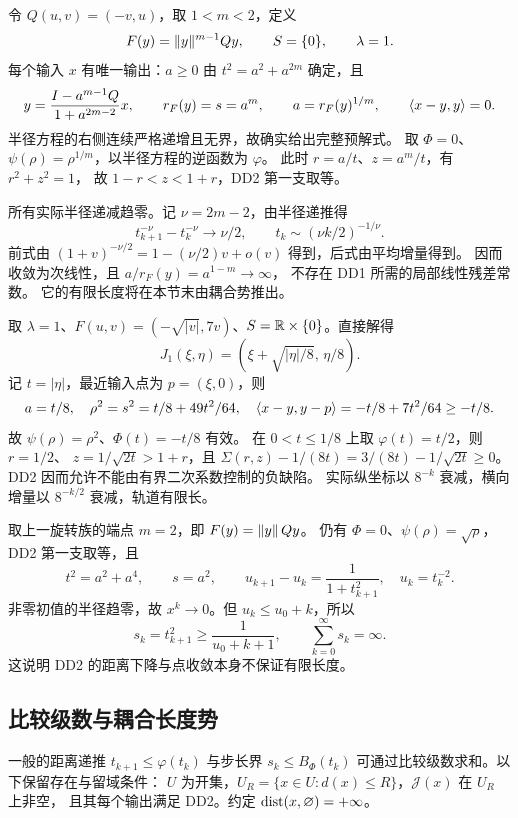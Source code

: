 \begin{example}[次线性收敛]\label{ex:dd2-rotation}
令 $Q(u,v)=(-v,u)$，取 $1<m<2$，定义
\[
 F(y)=\lVert y\rVert^{m-1}Qy,\qquad S=\{0\},\qquad \lambda=1.
\]
每个输入 $x$ 有唯一输出：$a\ge0$ 由 $t^2=a^2+a^{2m}$ 确定，且
\[
 y=\frac{I-a^{m-1}Q}{1+a^{2m-2}}x,\qquad
 r_F(y)=s=a^m,\qquad a=r_F(y)^{1/m},\qquad \langle x-y,y\rangle=0.
\]
半径方程的右侧连续严格递增且无界，故确实给出完整预解式。
取 $\Phi=0$、$\psi(\rho)=\rho^{1/m}$，以半径方程的逆函数为 $\varphi$。
此时 $r=a/t$、$z=a^m/t$，有 $r^2+z^2=1$，
故 $1-r<z<1+r$，DD2 第一支取等。

所有实际半径递减趋零。记 $\nu=2m-2$，由半径递推得
\[
 t_{k+1}^{-\nu}-t_k^{-\nu}\longrightarrow\nu/2,\qquad
 t_k\sim(\nu k/2)^{-1/\nu}.
\]
前式由 $(1+v)^{-\nu/2}=1-(\nu/2)v+o(v)$ 得到，后式由平均增量得到。
因而收敛为次线性，且 $a/r_F(y)=a^{1-m}\to\infty$，
不存在 DD1 所需的局部线性残差常数。
它的有限长度将在本节末由耦合势推出。
\end{example}

\begin{example}[低于二次阶的负缺陷]\label{ex:dd2-shear}
取 $\lambda=1$、$F(u,v)=(-\sqrt{|v|},7v)$、$S=\mathbb R\times\{0\}$。直接解得
\[
 J_1(\xi,\eta)=\left(\xi+\sqrt{|\eta|/8},\,\eta/8\right).
\]
记 $t=|\eta|$，最近输入点为 $p=(\xi,0)$，则
\[
 a=t/8,\quad \rho^2=s^2=t/8+49t^2/64,\quad
 \langle x-y,y-p\rangle=-t/8+7t^2/64\ge-t/8.
\]
故 $\psi(\rho)=\rho^2$、$\Phi(t)=-t/8$ 有效。
在 $0<t\le1/8$ 上取 $\varphi(t)=t/2$，则 $r=1/2$、
$z=1/\sqrt{2t}>1+r$，且
$\Sigma(r,z)-1/(8t)=3/(8t)-1/\sqrt{2t}\ge0$。
DD2 因而允许不能由有界二次系数控制的负缺陷。
实际纵坐标以 $8^{-k}$ 衰减，横向增量以 $8^{-k/2}$ 衰减，轨道有限长。
\end{example}

\begin{example}[点收敛而无限长]\label{ex:dd2-half}
取上一旋转族的端点 $m=2$，即 $F(y)=\lVert y\rVert\,Qy$。
仍有 $\Phi=0$、$\psi(\rho)=\sqrt\rho$，DD2 第一支取等，且
\[
 t^2=a^2+a^4,\qquad s=a^2,\qquad
 u_{k+1}-u_k=\frac1{1+t_{k+1}^2},\quad u_k=t_k^{-2}.
\]
非零初值的半径趋零，故 $x^k\to0$。但 $u_k\le u_0+k$，所以
\[
 s_k=t_{k+1}^2\ge\frac1{u_0+k+1},\qquad
 \sum_{k=0}^\infty s_k=\infty.
\]
这说明 DD2 的距离下降与点收敛本身不保证有限长度。
\end{example}

\subsection{比较级数与耦合长度势}

一般的距离递推 $t_{k+1}\le\varphi(t_k)$ 与步长界 $s_k\le B_\Phi(t_k)$
可通过比较级数求和。以下保留存在与留域条件：
$U$ 为开集，$U_R=\{x\in U:d(x)\le R\}$，$\mathcal J(x)$ 在 $U_R$ 上非空，
且其每个输出满足 DD2。约定 $\operatorname{dist}(x,\varnothing)=+\infty$。

